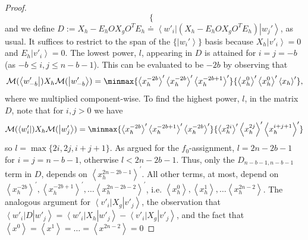 \documentclass{article}
\begin{document}
\begin{proof}
\begin{displaymath}
\begin{cases}
    \end{cases}
  \end{displaymath}and we define $D:=X_{h}-E_{h}OX_{g}O^{T}E_{h}\doteq\left\langle w'_{i}\right|\left(X_{h}-E_{h}OX_{g}O^{T}E_{h}\right)\left|w_{j}'\right\rangle$, as usual.
  It suffices to restrict to the span of the $\{\left|w_{i}'\right\rangle \}$
  basis because $X_{h}\left|v'_{i}\right\rangle =0$ and $E_{h}\left|v'_{i}\right\rangle =0$.
  The lowest power, $l$, appearing in $D$ is attained for $i=j=-b$ (as $-b\le i,j\le n-b-1$).
  This can be evaluated to be $-2b$ by observing that
  \begin{displaymath}
    \mathcal{M}(\left\langle w'_{-b}\right|)X_{h}\mathcal{M}(\left|w'_{-b}\right\rangle )=\minmax{\left\langle x_{h}^{-2b}\right\rangle ^{\prime}\left\langle x_{h}^{-2b}\right\rangle ^{\prime}\left\langle x_{h}^{-2b+1}\right\rangle ^{\prime}}{\left\langle x_{h}^{0}\right\rangle ^{\prime}\left\langle x_{h}^{0}\right\rangle ^{\prime}\left\langle x_{h}\right\rangle ^{\prime}},
  \end{displaymath}
  where we multiplied component-wise. To find the highest power, $l$,
  in the matrix $D$, note that for $i,j>0$ we have
  \begin{displaymath}
    \mathcal{M}(\left\langle w'_{i}\right|)X_{h}\mathcal{M}(\left|w'_{j}\right\rangle )=\minmax{\left\langle x_{h}^{-2b}\right\rangle ^{\prime}\left\langle x_{h}^{-2b+1}\right\rangle ^{\prime}\left\langle x_{h}^{-2b}\right\rangle ^{\prime}}{\left\langle x_{h}^{2i}\right\rangle ^{\prime}\left\langle x_{h}^{2j}\right\rangle ^{\prime}\left\langle x_{h}^{i+j+1}\right\rangle ^{\prime}}
  \end{displaymath}
  so $l=\max\{2i,2j,i+j+1\}$. As argued for the $f_{0}$-assignment,
  $l=2n-2b-1$ for $i=j=n-b-1$, otherwise $l<2n-2b-1$.
  Thus, only the $D_{n-b-1,n-b-1}$ term in $D$, depends on $\left\langle x_{h}^{2n-2b-1}\right\rangle ^{\prime}$.
  All other terms, at most, depend on $\left\langle x_{h}^{-2b}\right\rangle ^{\prime},\left\langle x_{h}^{-2b+1}\right\rangle ^{\prime},\dots\left\langle x_{h}^{2n-2b-2}\right\rangle ^{\prime}$,
  i.e. $\left\langle x_{h}^{0}\right\rangle ,\left\langle x_{h}^{1}\right\rangle ,\dots\left\langle x_{h}^{2n-2}\right\rangle $.
  The analogous argument for $\left\langle v'_{i}\right|X_{g}\left|v'_{j}\right\rangle $,
  the observation that $\left\langle w'_{i}\right|D\left|w'_{j}\right\rangle =\left\langle w'_{i}\right|X_{h}\left|w'_{j}\right\rangle -\left\langle v'_{i}\right|X_{g}\left|v'_{j}\right\rangle $,
  and the fact that $\left\langle x^{0}\right\rangle =\left\langle x^{1}\right\rangle =\dots=\left\langle x^{2n-2}\right\rangle =0$

\end{proof}
\end{document}
